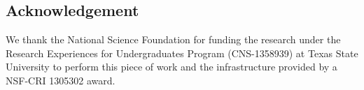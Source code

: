 \subsection*{Acknowledgement}
We thank the National Science Foundation for funding the research under the Research Experiences for Undergraduates Program (CNS-1358939) at Texas State University to perform this piece of work and the infrastructure provided by a NSF-CRI 1305302 award.